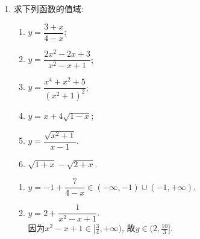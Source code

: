 \begin{enumerate}
\begin{jieda}
\begin{enumerate}[(1)]
\item $f(x)=\begin{cases}
x^2+2ax-a^2, & x\leq a\\
3x^2-2ax+a^2, & x\geq a
\end{cases}$. \\
函数图象由两个二次函数图象的部分拼接而成，且拼接处连续，分析两个开口向上的二次函数的对称轴可知，一个为$x = -a$，一个为$\dfrac{a}{3}$ \\
讨论拼接点$x = a$与两个对称轴不同的位置关系下函数的单调性，即可得到函数的最小值，在不同的拼接点条件下寻找全局的最小值即为所求. 
\begin{enumerate}
    \item $a = 0$时，三者重合，此时最小值为$0$ 
    \item $a > 0$时，$-a < \dfrac{a}{3} < a$，故函数$f(x)$在第一段上先减后增，在第二段上单调增，因此最小值在第一段的顶点处取得（$x = -a$），最小值为$-2a^2$
    \item $a < 0$时，$a < \dfrac{a}{3} < -a$，故函数$f(x)$在第一段上单调递减，在第二段上先减后增，因此最小值在第二段顶点取得（$x = \dfrac{a}{3}$），最小值为$\dfrac{2a^2}{3}$
\end{enumerate}
综上，$a < 0$时为$\dfrac{2a^2}{3}$，$a \geq 0$时，$f(x)$的最小值为$-2a^2$. \\
\ps 最值需要通过单调性来说明，分段函数分段求，分析各段上函数的单调性.
另外, 本题的另一个麻烦之处在于函数中的分段点与参数$a$有关, 各段中的``对称轴''(单调区间的端点)亦与参数$a$有关. 
\end{enumerate}
\end{jieda}
\clearpage
\item 求下列函数的值域: 
\begin{enumerate}
\item $y=\dfrac{3+x}{4-x}$; 
\item $y=\dfrac{2x^2-2x+3}{x^2-x+1}$; 
\item $y=\dfrac{x^4+x^2+5}{(x^2+1)^2}$; 
\item $y=x+4\sqrt{1-x}$; 
\item $y=\dfrac{\sqrt{x^2+1}}{x-1}$. 
\item $\sqrt{1+x} - \sqrt{2+x}$.
\end{enumerate}
\begin{jieda}
\begin{enumerate}
\item $y=-1+\dfrac{7}{4-x}\in(-\infty,-1)\cup(-1,+\infty)$. 

\item $y=2+\dfrac{1}{x^2-x+1}$. \\
因为$x^2-x+1\in[\frac{3}{4},+\infty)$, 故$y\in(2,\frac{10}{3}]$. 


\end{enumerate}
\end{jieda}
\end{enumerate}
